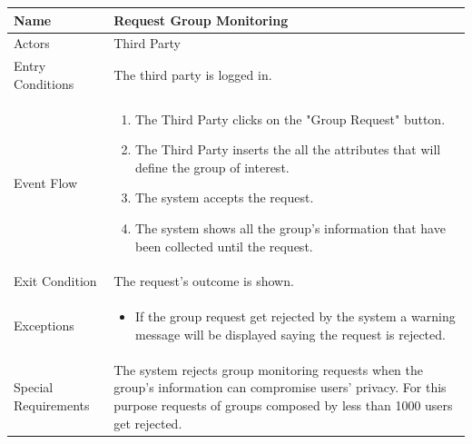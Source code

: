 \begin{enumerate}
\FloatBarrier
\begin{table}[h]
\begin{tabular}{|l|p{}|}
\hline
Name             & Request Group Monitoring \\ \hline
Actors           & Third Party  \\ \hline
Entry Conditions & The third party is logged in.    \\ \hline
Event Flow       & \begin{enumerate}
            \item The Third Party clicks on the "Group Request" button.
            \item The Third Party inserts the all the attributes that will define the group of interest.
            \item The system accepts the request.
            \item The system shows all the group's information that have been collected until the request. 
        \end{enumerate}\\ \hline
Exit Condition   & The request's outcome is shown.\\ \hline
Exceptions       & \begin{itemize}
\item If the group request get rejected by the system a warning message will be displayed saying the request is rejected.
\end{itemize}\\ \hline
Special Requirements & The system rejects group monitoring requests when the group's information can compromise users' privacy. For this purpose requests of groups composed by less than 1000 users get rejected.
\\ \hline
\end{tabular}
\end{table}
\FloatBarrier


\end{enumerate}
